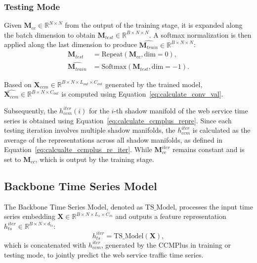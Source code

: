 \subsubsection{Testing Mode}
Given \(\mathbf{M}_{cc} \in \mathbb{R}^{N \times N} \) from the output of the training stage, it is expanded along the batch dimension to obtain \( \mathbf{M}_{test} \in \mathbb{R}^{B \times N \times N} \). A softmax normalization is then applied along the last dimension to produce \( \widehat{\mathbf{M}_{train}} \in \mathbb{R}^{B \times N \times N} \):
\begin{align}
\mathbf{M}_{test} &= \text{Repeat}(\mathbf{M}_{cc}, \text{dim}=0), \nonumber\\
\widehat{\mathbf{M}_{train}} &= \text{Softmax}(\mathbf{M}_{test}, \text{dim}=-1).\nonumber
\end{align}


Based on $\mathbf{X}_{ccm} \in \mathbb{R}^{B\times N\times L_{out}\times C_{out}}$ generated by the trained model, \( \widehat{\mathbf{X}_{ccm}} \in \mathbb{R}^{B\times N \times C_{out}} \) is computed using Equation~\ref{eq:calculate_conv_val}. 

Subsequently, the $h_{ccm}^{iter}(i)$ for the \( i \)-th shadow manifold of the web service time series is obtained using Equation~\ref{eq:calculate_ccmplus_repre}. Since each testing iteration involves multiple shadow manifolds, the  $h_{ccm}^{iter}$ is calculated as the average of the representations across all shadow manifolds, as defined in Equation~\ref{eq:calcualte_ccmplus_re_iter}. While ${\mathbf{M}_{cc}^{iter}}$ remains constant and is set to \( \mathbf{M}_{cc} \), which is output by the training stage.

\subsection{Backbone Time Series Model}
\label{sec:backbone_ts_model}
The Backbone Time Series Model, denoted as \( \text{TS\_Model} \), processes the input time series embedding \( \mathbf{X} \in \mathbb{R}^{B \times N \times L_x \times C_{in}} \) and outputs a feature representation \( h_{ts}^{iter} \in \mathbb{R}^{B \times N \times d_{ts}} \):
\begin{equation}
h_{ts}^{iter} = \text{TS\_Model}(\mathbf{X}),\nonumber
\end{equation}
which is concatenated with  \( h_{ccm}^{iter} \), generated by the CCMPlus in training or testing mode, to jointly predict the web service traffic time series.

